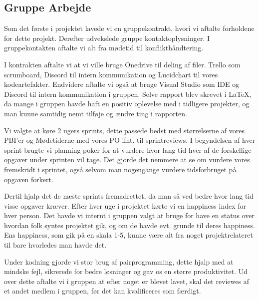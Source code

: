 \subsection{Gruppe Arbejde}
Som det første i projektet lavede vi en gruppekontrakt, 
hvori vi aftalte forholdene for dette projekt. Derefter udvekslede gruppe kontaktoplysninger.
I gruppekontakten aftalte vi alt fra mødetid til konflikthåndtering.


I kontrakten aftalte vi at vi ville bruge Onedrive til deling af filer. Trello som scrumboard,
Discord til intern kommunikation og Lucidchart til vores kodeartefakter. Endvidere aftalte vi også
at bruge Visual Studio som IDE og Discord til intern kommunikation i gruppen.
Selve rapport blev skrevet i \LaTeX, da mange i gruppen havde haft en positiv oplevelse med
i tidligere projekter, og man kunne samtidig nemt tilføje og ændre ting i rapporten.


Vi valgte at køre 2 ugers sprints, dette passede bedst med størrelserne af vores
PBI'er og Mødetiderne med vores PO ifht. til sprintreviews.
I begyndelsen af hver sprint brugte vi planning poker for at vurdere hvor lang tid
hver af de forskellige opgaver under sprinten vil tage. Det gjorde det nemmere at se 
om vurdere vores fremskridt i sprintet, også selvom man nogengange vurdere tidsforbruget på opgaven forkert.


Dertil hjalp det de næste sprints fremadrettet, da man så ved bedre hvor lang tid visse opgaver kræver.
Efter hver uge i projektet kørte vi en happiness index for hver person. Det havde vi internt i gruppen valgt
at bruge for have en status over hvordan folk syntes projektet gik, og om de havde evt. grunde til deres happiness.
Ens happiness, som gik på en skala 1-5, kunne være alt fra noget projektrelateret til bare hvorledes man havde det.


Under kodning gjorde vi stor brug af pairprogramming, dette hjalp med at mindske fejl, sikrerede for bedre løsninger
og gav os en større produktivitet. Ud over dette aftalte vi i gruppen at efter noget er blevet lavet, 
skal det reviewes af et andet medlem i gruppen, før det kan kvalificeres som færdigt.

